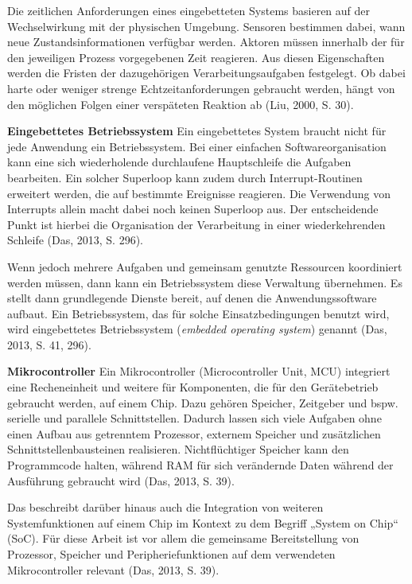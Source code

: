 Die zeitlichen Anforderungen eines eingebetteten Systems basieren auf der Wechselwirkung mit der physischen Umgebung. Sensoren bestimmen dabei, wann neue Zustandsinformationen verfügbar werden. Aktoren müssen innerhalb der für den jeweiligen Prozess vorgegebenen Zeit reagieren. Aus diesen Eigenschaften werden die Fristen der dazugehörigen Verarbeitungsaufgaben festgelegt. Ob dabei harte oder weniger strenge Echtzeitanforderungen gebraucht werden, hängt von den möglichen Folgen einer verspäteten Reaktion ab (Liu, 2000, S. 30).

\textbf{Eingebettetes Betriebssystem }Ein eingebettetes System braucht nicht für jede Anwendung ein Betriebssystem. Bei einer einfachen Softwareorganisation kann eine sich wiederholende durchlaufene Hauptschleife die Aufgaben bearbeiten. Ein solcher Superloop kann zudem durch Interrupt-Routinen erweitert werden, die auf bestimmte Ereignisse reagieren. Die Verwendung von Interrupts allein macht dabei noch keinen Superloop aus. Der entscheidende Punkt ist hierbei die Organisation der Verarbeitung in einer wiederkehrenden Schleife (Das, 2013, S. 296).

Wenn jedoch mehrere Aufgaben und gemeinsam genutzte Ressourcen koordiniert werden müssen, dann kann ein Betriebssystem diese Verwaltung übernehmen. Es stellt dann grundlegende Dienste bereit, auf denen die Anwendungssoftware aufbaut. Ein Betriebssystem, das für solche Einsatzbedingungen benutzt wird, wird eingebettetes Betriebssystem (\emph{embedded operating system}) genannt (Das, 2013, S. 41, 296).

\textbf{Mikrocontroller }Ein Mikrocontroller (Microcontroller Unit, MCU) integriert eine Recheneinheit und weitere für Komponenten, die für den Gerätebetrieb gebraucht werden, auf einem Chip. Dazu gehören Speicher, Zeitgeber und bspw. serielle und parallele Schnittstellen. Dadurch lassen sich viele Aufgaben ohne einen Aufbau aus getrenntem Prozessor, externem Speicher und zusätzlichen Schnittstellenbausteinen realisieren. Nichtflüchtiger Speicher kann den Programmcode halten, während RAM für sich verändernde Daten während der Ausführung gebraucht wird (Das, 2013, S. 39).

Das beschreibt darüber hinaus auch die Integration von weiteren Systemfunktionen auf einem Chip im Kontext zu dem Begriff „System on Chip“ (SoC). Für diese Arbeit ist vor allem die gemeinsame Bereitstellung von Prozessor, Speicher und Peripheriefunktionen auf dem verwendeten Mikrocontroller relevant (Das, 2013, S. 39).


